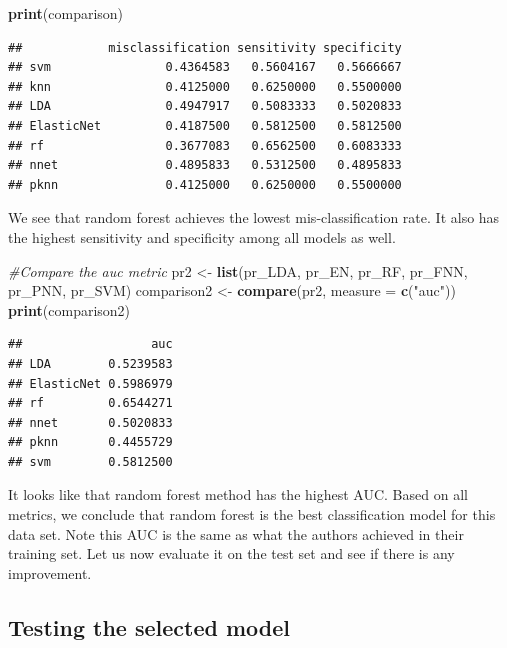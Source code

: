 \documentclass[
]{article}
\newenvironment{Shaded}{\begin{snugshade}}{\end{snugshade}}
\newcommand{\AttributeTok}[1]{\textcolor[rgb]{0.13,0.29,0.53}{#1}}
\newcommand{\CommentTok}[1]{\textcolor[rgb]{0.56,0.35,0.01}{\textit{#1}}}
\newcommand{\FunctionTok}[1]{\textcolor[rgb]{0.13,0.29,0.53}{\textbf{#1}}}
\newcommand{\NormalTok}[1]{#1}
\newcommand{\OtherTok}[1]{\textcolor[rgb]{0.56,0.35,0.01}{#1}}
\newcommand{\StringTok}[1]{\textcolor[rgb]{0.31,0.60,0.02}{#1}}
\begin{document}
\begin{Shaded}
\begin{Highlighting}[]
\FunctionTok{print}\NormalTok{(comparison)}
\end{Highlighting}
\end{Shaded}

\begin{verbatim}
##            misclassification sensitivity specificity
## svm                0.4364583   0.5604167   0.5666667
## knn                0.4125000   0.6250000   0.5500000
## LDA                0.4947917   0.5083333   0.5020833
## ElasticNet         0.4187500   0.5812500   0.5812500
## rf                 0.3677083   0.6562500   0.6083333
## nnet               0.4895833   0.5312500   0.4895833
## pknn               0.4125000   0.6250000   0.5500000
\end{verbatim}

We see that random forest achieves the lowest mis-classification rate.
It also has the highest sensitivity and specificity among all models as
well.

\begin{Shaded}
\begin{Highlighting}[]
\CommentTok{\#Compare the auc metric}
\NormalTok{pr2 }\OtherTok{\textless{}{-}} \FunctionTok{list}\NormalTok{(pr\_LDA, pr\_EN, pr\_RF, pr\_FNN, pr\_PNN, pr\_SVM)}
\NormalTok{comparison2 }\OtherTok{\textless{}{-}} \FunctionTok{compare}\NormalTok{(pr2, }\AttributeTok{measure =} \FunctionTok{c}\NormalTok{(}\StringTok{"auc"}\NormalTok{))}
\FunctionTok{print}\NormalTok{(comparison2)}
\end{Highlighting}
\end{Shaded}

\begin{verbatim}
##                  auc
## LDA        0.5239583
## ElasticNet 0.5986979
## rf         0.6544271
## nnet       0.5020833
## pknn       0.4455729
## svm        0.5812500
\end{verbatim}

It looks like that random forest method has the highest AUC. Based on
all metrics, we conclude that random forest is the best classification
model for this data set. Note this AUC is the same as what the authors
achieved in their training set. Let us now evaluate it on the test set
and see if there is any improvement.

\hypertarget{testing-the-selected-model}{%
\subsection{Testing the selected
model}\label{testing-the-selected-model}}
\end{document}
